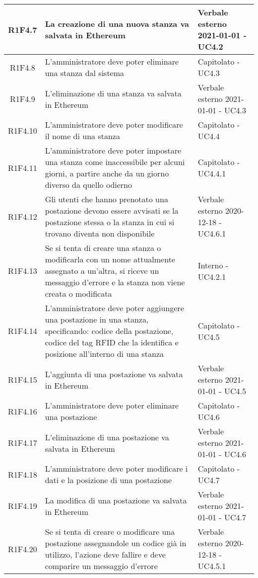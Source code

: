 \begin{center}
\begin{longtable}{|c|p{10cm}|p{4cm}|}
						\hline
				R1F4.7&	La creazione di una nuova stanza va salvata in Ethereum&Verbale esterno 2021-01-01 - UC4.2 	\\
						\hline
				R1F4.8&L'amministratore deve poter eliminare una stanza dal sistema	& Capitolato - UC4.3	\\
						\hline
				R1F4.9&L'eliminazione di una stanza va salvata in Ethereum	& Verbale esterno 2021-01-01 - UC4.3	\\
						\hline
				R1F4.10&L'amministratore deve poter modificare il nome di una stanza	& Capitolato - UC4.4	\\
						\hline
			R1F4.11&L'amministratore deve poter impostare una stanza come inaccessibile per alcuni giorni, a partire anche da un giorno diverso da quello odierno	& Capitolato - UC4.4.1	\\
					\hline
			R1F4.12&Gli utenti che hanno prenotato una postazione devono essere avvisati se la postazione stessa o la stanza in cui si trovano diventa non disponibile	& Verbale esterno 2020-12-18 - UC4.6.1	\\
					\hline
R1F4.13&Se si tenta di creare una stanza o modificarla con un nome attualmente assegnato a un'altra, si riceve un messaggio d'errore e la stanza non viene creata o modificata	& Interno - UC4.2.1	\\
						\hline
			R1F4.14&L'amministratore deve poter aggiungere una postazione in una stanza, specificando: codice della postazione, codice del tag RFID che la identifica e posizione all'interno di una stanza	& Capitolato - UC4.5	\\
					\hline
			R1F4.15&L'aggiunta di una postazione va salvata in Ethereum	&Verbale esterno 2021-01-01 - UC4.5 	\\
					\hline
R1F4.16&L'amministratore deve poter eliminare una postazione	& Capitolato - UC4.6	\\
						\hline
		R1F4.17	&L'eliminazione di una postazione va salvata in Ethereum	& Verbale esterno 2021-01-01 - UC4.6	\\
					\hline
			R1F4.18&L'amministratore deve poter modificare i dati e la posizione di una postazione	& Capitolato - UC4.7	\\
					\hline
R1F4.19&	La modifica di una postazione va salvata in Ethereum& Verbale esterno 2021-01-01 - UC4.7	\\
					\hline
R1F4.20&	Se si tenta di creare o modificare una postazione assegnandole un codice già in utilizzo, l'azione deve fallire e deve comparire un messaggio d'errore& Verbale esterno 2020-12-18 - UC4.5.1 	\\

\end{longtable}
\end{center}
